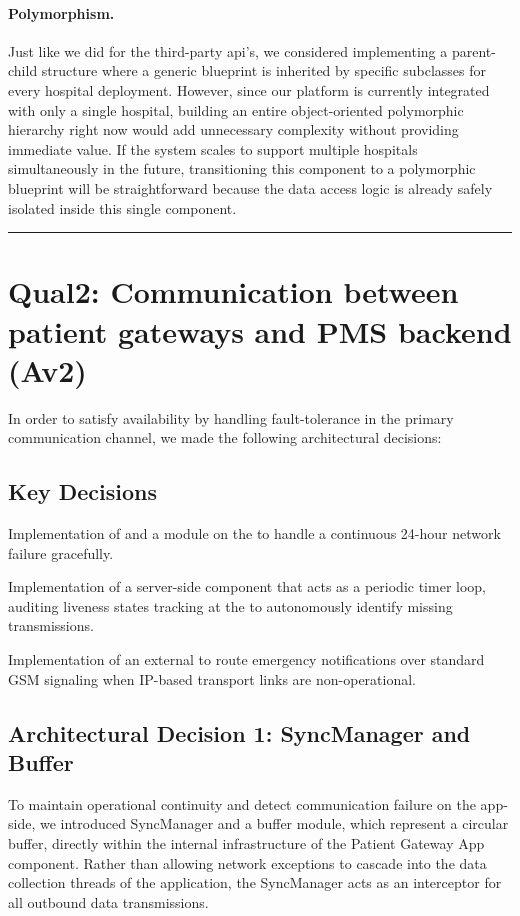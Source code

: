 \paragraph{Polymorphism.}
Just like we did for the third-party api's, we considered implementing a parent-child structure where a generic blueprint is inherited by specific subclasses for every hospital deployment. However, since our platform is currently integrated with only a single hospital, building an entire object-oriented polymorphic hierarchy right now would add unnecessary complexity without providing immediate value. If the system scales to support multiple hospitals simultaneously in the future, transitioning this component to a polymorphic blueprint will be straightforward because the data access logic is already safely isolated inside this single component.


\noindent\rule{17cm}{0.3pt}

\section{Qual2: Communication between patient gateways and PMS backend (Av2)}
In order to satisfy availability by handling fault-tolerance in the primary communication channel, we made the following architectural decisions:
\subsection*{Key Decisions}
\begin{adlist}
	\item Implementation of  and a  module on the  to handle a continuous 24-hour network failure gracefully.
	\item Implementation of a server-side  component that acts as a periodic timer loop, auditing liveness states tracking at the  to autonomously identify missing transmissions.
	\item Implementation of an external  to route emergency notifications over standard GSM signaling when IP-based transport links are non-operational.
\end{adlist}

\subsection*{Architectural Decision 1:  SyncManager and Buffer}
To maintain operational continuity and detect communication failure on the app-side, we introduced SyncManager and a buffer module, which represent a circular buffer, directly within the internal infrastructure of the Patient Gateway App component. Rather than allowing network exceptions to cascade into the data collection threads of the application, the SyncManager acts as an interceptor for all outbound data transmissions.

